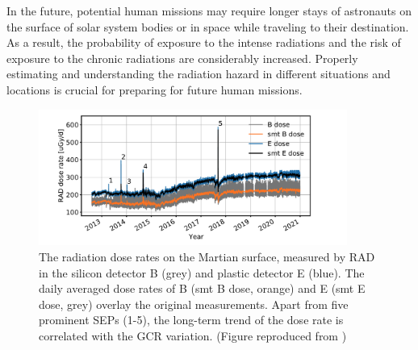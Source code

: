 In the future, potential human missions may require longer stays of astronauts on the surface of solar system bodies or in space while traveling to their destination. As a result, the probability of exposure to the intense radiations and the risk of exposure to the chronic radiations are considerably increased. Properly estimating and understanding the radiation hazard in different situations and locations is crucial for preparing for future human missions.







\begin{figure}[!hbt]
	\centering
	\includegraphics[width = 0.9\textwidth]{images/Rad_GCR_radiation.png}
	\caption[The long term radiation dose rates on the Martian surface]{The radiation dose rates on the Martian surface, measured by \ac{RAD} in the silicon detector B (grey) and plastic detector E (blue). The daily averaged dose rates of B (smt B dose, orange) and E (smt E dose, grey) overlay the original measurements. Apart from five prominent \acp{SEP} (1-5), the long-term trend of the dose rate is correlated with the \ac{GCR} variation. (Figure reproduced from \citet{Guo2021AARv_rad})}
	\label{Fig:Rad_GCR_radiation}
\end{figure}


